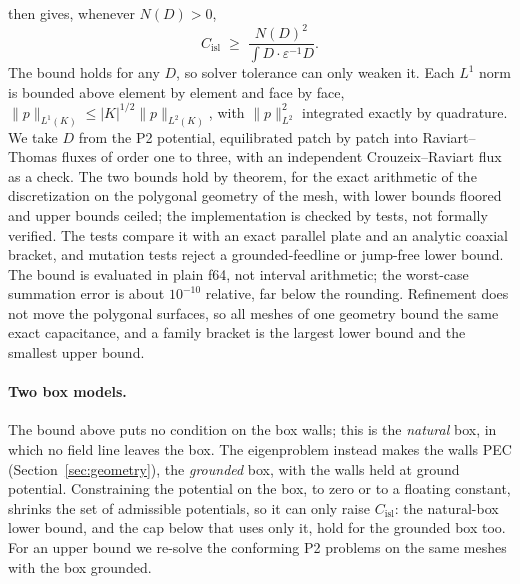 \documentclass{anvil-paper}
\newcommand{\Cisl}{C_{\mathrm{isl}}}
\begin{document}
then gives, whenever $N(D) > 0$,
\begin{equation}
  \Cisl \;\ge\; \frac{N(D)^2}{\int D\cdot\varepsilon^{-1}D}.
  \label{eq:cert}
\end{equation}
The bound holds for any $D$, so solver tolerance can only weaken it. Each
$L^1$ norm is bounded above element by element and face by face,
$\lVert p\rVert_{L^1(K)} \le |K|^{1/2}\lVert p\rVert_{L^2(K)}$, with
$\lVert p\rVert_{L^2}^2$ integrated exactly by quadrature. We
take $D$ from the P2 potential, equilibrated patch by patch into
Raviart--Thomas fluxes of order one to three, with an independent
Crouzeix--Raviart flux as a check. The two bounds hold by theorem, for the
exact arithmetic of the discretization on the polygonal geometry of the
mesh, with lower bounds floored and upper bounds ceiled; the implementation
is checked by tests, not formally verified. The tests compare it with an
exact parallel plate and an analytic coaxial bracket, and mutation tests
reject a grounded-feedline or jump-free lower bound. The bound is evaluated
in plain f64, not interval arithmetic; the worst-case summation error is about
$10^{-10}$ relative, far below the rounding. Refinement does not move the
polygonal surfaces, so all meshes of one geometry bound the same exact
capacitance, and a family bracket is the largest lower bound and the
smallest upper bound.

\paragraph{Two box models.}
The bound above puts no condition on the box walls; this is the
\emph{natural} box, in which no field line leaves the box. The
eigenproblem instead makes the walls PEC (Section~\ref{sec:geometry}),
the \emph{grounded} box, with the walls held at ground potential.
Constraining the potential on the box,
to zero or to a floating constant, shrinks the set of admissible
potentials, so it can only raise $\Cisl$: the natural-box lower bound, and
the cap below that uses only it, hold for the grounded box too. For an upper
bound we re-solve the conforming P2 problems on the same meshes with the
box grounded.
\end{document}
